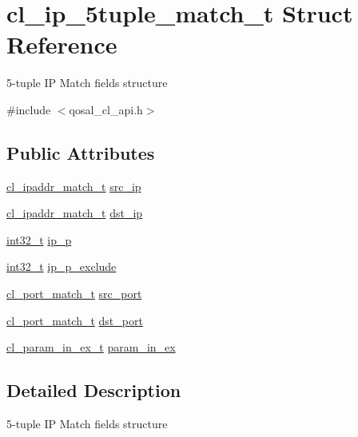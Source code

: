 \hypertarget{structcl__ip__5tuple__match__t}{\section{cl\-\_\-ip\-\_\-5tuple\-\_\-match\-\_\-t Struct Reference}
\label{structcl__ip__5tuple__match__t}
}


5-\/tuple I\-P Match fields structure  




{\ttfamily \#include $<$qosal\-\_\-cl\-\_\-api.\-h$>$}

\subsection*{Public Attributes}
\begin{DoxyCompactItemize}
\item 
\hyperlink{structcl__ipaddr__match__t}{cl\-\_\-ipaddr\-\_\-match\-\_\-t} \hyperlink{structcl__ip__5tuple__match__t_aeb63c3c0bd893819a2257c47c4d1f1c8}{src\-\_\-ip}
\item 
\hyperlink{structcl__ipaddr__match__t}{cl\-\_\-ipaddr\-\_\-match\-\_\-t} \hyperlink{structcl__ip__5tuple__match__t_ae64911318dd2c0b8bd78a66cee70e6ee}{dst\-\_\-ip}
\item 
\hyperlink{commondefs_8h_a32f2e37ee053cf2ce8ca28d1f74630e5}{int32\-\_\-t} \hyperlink{structcl__ip__5tuple__match__t_a5447664eb7486da5424d6022f31a6212}{ip\-\_\-p}
\item 
\hyperlink{commondefs_8h_a32f2e37ee053cf2ce8ca28d1f74630e5}{int32\-\_\-t} \hyperlink{structcl__ip__5tuple__match__t_aa22d6ac44d06a368be8a3d6aebea9380}{ip\-\_\-p\-\_\-exclude}
\item 
\hyperlink{structcl__port__match__t}{cl\-\_\-port\-\_\-match\-\_\-t} \hyperlink{structcl__ip__5tuple__match__t_ae35e648a631112c8bf6e7473e2f5f8e8}{src\-\_\-port}
\item 
\hyperlink{structcl__port__match__t}{cl\-\_\-port\-\_\-match\-\_\-t} \hyperlink{structcl__ip__5tuple__match__t_a0fe61ca8c96e29c5da6add2108fc4762}{dst\-\_\-port}
\item 
\hyperlink{structcl__param__in__ex__t}{cl\-\_\-param\-\_\-in\-\_\-ex\-\_\-t} \hyperlink{structcl__ip__5tuple__match__t_af95e2941e57be656c6fd1490345bd7a3}{param\-\_\-in\-\_\-ex}
\end{DoxyCompactItemize}


\subsection{Detailed Description}
5-\/tuple I\-P Match fields structure 

